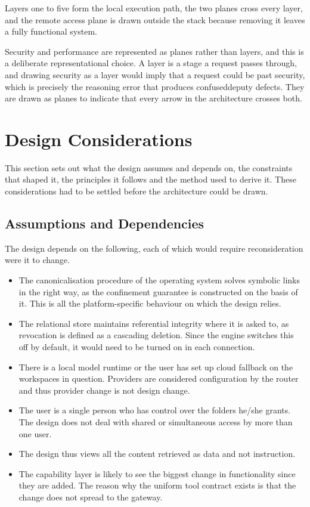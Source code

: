 \documentclass{FastFyp}
\begin{document}
Layers one to five form the local execution path, the two planes cross every layer, and the remote access plane is drawn outside the stack because removing it leaves a fully functional system.

Security and performance are represented as planes rather than layers, and this is a deliberate representational choice. A layer is a stage a request passes through, and drawing security as a layer would imply that a request could be past security, which is precisely the reasoning error that produces confuseddeputy defects. They are drawn as planes to indicate that every arrow in the architecture crosses both.


\section{Design Considerations}
This section sets out what the design assumes and depends on, the constraints that shaped it, the principles it follows and the method used to derive it. These considerations had to be settled before the architecture could be drawn.

\subsection{Assumptions and Dependencies}
The design depends on the following, each of which would require reconsideration were it to change.

\begin{itemize}
    \item The canonicalisation procedure of the operating system solves symbolic links in the right way, as the confinement guarantee is constructed on the basis of it. This is all the platform-specific behaviour on which the design relies.
    \item The relational store maintains referential integrity where it is asked to, as revocation is defined as a cascading deletion. Since the engine switches this off by default, it would need to be turned on in each connection.
    \item There is a local model runtime or the user has set up cloud fallback on the workspaces in question. Providers are considered configuration by the router and thus provider change is not design change.
    \item The user is a single person who has control over the folders he/she grants. The design does not deal with shared or simultaneous access by more than one user.
    \item The design thus views all the content retrieved as data and not instruction.
    \item The capability layer is likely to see the biggest change in functionality since they are added. The reason why the uniform tool contract exists is that the change does not spread to the gateway.
\end{itemize}
\end{document}
